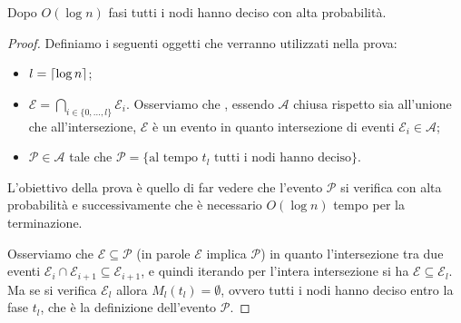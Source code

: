 \documentclass{article}
\begin{document}
\begin{theorem}
    Dopo $O(\log{n})$ fasi tutti i nodi hanno deciso con alta probabilit\`a.
\end{theorem}

\begin{proof}
    Definiamo i seguenti oggetti che verranno utilizzati nella prova:
    \begin{itemize}
        \item $l = \lceil \log{n} \rceil$;
        \item $\mathcal{E} = \bigcap_{i \in 
            \lbrace 0, \ldots, l \rbrace}{\mathcal{E}_i}$. Osserviamo che 
            , essendo $\mathcal{A}$  chiusa 
            rispetto sia all'unione che all'intersezione, $\mathcal{E}$ 
            \`e un evento in quanto intersezione di eventi $\mathcal{E}_i 
            \in \mathcal{A}$;
        \item $\mathcal{P} \in \mathcal{A}$ tale che $\mathcal{P} = 
            \lbrace \text{al tempo $t_l$ tutti i nodi hanno deciso} \rbrace$.
    \end{itemize}

    L'obiettivo della prova \`e quello di far vedere che l'evento 
    $\mathcal{P}$ si verifica con alta probabilit\`a e successivamente
    che \`e necessario $O(\log{n})$ tempo per la terminazione. 

    Osserviamo che $\mathcal{E}\subseteq\mathcal{P}$ (in parole $\mathcal{E}$ 
    implica $\mathcal{P}$) in quanto l'intersezione tra due eventi 
    $\mathcal{E}_i \cap \mathcal{E}_{i+1} \subseteq \mathcal{E}_{i+1}$,
    e quindi iterando per l'intera intersezione si ha $\mathcal{E} 
    \subseteq \mathcal{E}_l$. Ma se si verifica $\mathcal{E}_l$ allora
    $M_l(t_l) = \emptyset$, ovvero tutti i nodi hanno deciso entro la fase
    $t_l$, che \`e la definizione dell'evento $\mathcal{P}$.


\end{proof}
\end{document}

